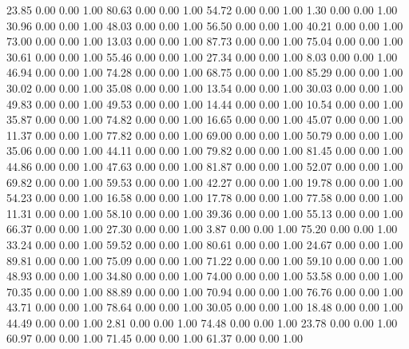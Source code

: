    23.85   0.00   0.00   1.00
   80.63   0.00   0.00   1.00
   54.72   0.00   0.00   1.00
    1.30   0.00   0.00   1.00
   30.96   0.00   0.00   1.00
   48.03   0.00   0.00   1.00
   56.50   0.00   0.00   1.00
   40.21   0.00   0.00   1.00
   73.00   0.00   0.00   1.00
   13.03   0.00   0.00   1.00
   87.73   0.00   0.00   1.00
   75.04   0.00   0.00   1.00
   30.61   0.00   0.00   1.00
   55.46   0.00   0.00   1.00
   27.34   0.00   0.00   1.00
    8.03   0.00   0.00   1.00
   46.94   0.00   0.00   1.00
   74.28   0.00   0.00   1.00
   68.75   0.00   0.00   1.00
   85.29   0.00   0.00   1.00
   30.02   0.00   0.00   1.00
   35.08   0.00   0.00   1.00
   13.54   0.00   0.00   1.00
   30.03   0.00   0.00   1.00
   49.83   0.00   0.00   1.00
   49.53   0.00   0.00   1.00
   14.44   0.00   0.00   1.00
   10.54   0.00   0.00   1.00
   35.87   0.00   0.00   1.00
   74.82   0.00   0.00   1.00
   16.65   0.00   0.00   1.00
   45.07   0.00   0.00   1.00
   11.37   0.00   0.00   1.00
   77.82   0.00   0.00   1.00
   69.00   0.00   0.00   1.00
   50.79   0.00   0.00   1.00
   35.06   0.00   0.00   1.00
   44.11   0.00   0.00   1.00
   79.82   0.00   0.00   1.00
   81.45   0.00   0.00   1.00
   44.86   0.00   0.00   1.00
   47.63   0.00   0.00   1.00
   81.87   0.00   0.00   1.00
   52.07   0.00   0.00   1.00
   69.82   0.00   0.00   1.00
   59.53   0.00   0.00   1.00
   42.27   0.00   0.00   1.00
   19.78   0.00   0.00   1.00
   54.23   0.00   0.00   1.00
   16.58   0.00   0.00   1.00
   17.78   0.00   0.00   1.00
   77.58   0.00   0.00   1.00
   11.31   0.00   0.00   1.00
   58.10   0.00   0.00   1.00
   39.36   0.00   0.00   1.00
   55.13   0.00   0.00   1.00
   66.37   0.00   0.00   1.00
   27.30   0.00   0.00   1.00
    3.87   0.00   0.00   1.00
   75.20   0.00   0.00   1.00
   33.24   0.00   0.00   1.00
   59.52   0.00   0.00   1.00
   80.61   0.00   0.00   1.00
   24.67   0.00   0.00   1.00
   89.81   0.00   0.00   1.00
   75.09   0.00   0.00   1.00
   71.22   0.00   0.00   1.00
   59.10   0.00   0.00   1.00
   48.93   0.00   0.00   1.00
   34.80   0.00   0.00   1.00
   74.00   0.00   0.00   1.00
   53.58   0.00   0.00   1.00
   70.35   0.00   0.00   1.00
   88.89   0.00   0.00   1.00
   70.94   0.00   0.00   1.00
   76.76   0.00   0.00   1.00
   43.71   0.00   0.00   1.00
   78.64   0.00   0.00   1.00
   30.05   0.00   0.00   1.00
   18.48   0.00   0.00   1.00
   44.49   0.00   0.00   1.00
    2.81   0.00   0.00   1.00
   74.48   0.00   0.00   1.00
   23.78   0.00   0.00   1.00
   60.97   0.00   0.00   1.00
   71.45   0.00   0.00   1.00
   61.37   0.00   0.00   1.00
